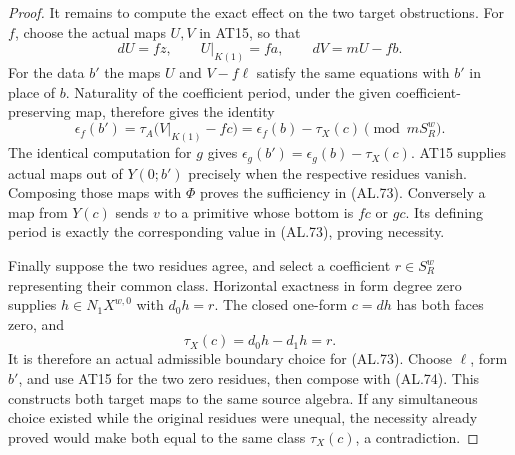 \begin{proof}
It remains to compute the exact effect on the two target
obstructions. For $f$, choose the actual maps $U,V$ in AT15,
so that
\[
 dU=fz,\qquad U|_{K(1)}=fa,\qquad dV=mU-fb.
\]
For the data $b'$ the maps $U$ and $V-f\ell$ satisfy the
same equations with $b'$ in place of $b$. Naturality of the
coefficient period, under the given coefficient-preserving map,
therefore gives the identity
\[
 \epsilon_f(b')
    =\tau_A\bigl(V|_{K(1)}-fc\bigr)
    =\epsilon_f(b)-\tau_X(c)\pmod {mS_R^w}.
 \tag{AL.75}
\]
The identical computation for $g$ gives
$\epsilon_g(b')=\epsilon_g(b)-\tau_X(c)$.
AT15 supplies actual maps out of $Y(0;b')$ precisely when
the respective residues vanish. Composing those maps with
$\Phi$ proves the sufficiency in \textup{(AL.73)}.
Conversely a map from $Y(c)$ sends $v$ to a primitive whose
bottom is $fc$ or $gc$. Its defining period is exactly the
corresponding value in \textup{(AL.73)}, proving necessity.

Finally suppose the two residues agree, and select a coefficient
$r\in S_R^w$ representing their common class.
Horizontal exactness in form degree zero supplies
$h\in N_1X^{w,0}$ with $d_0h=r$.
The closed one-form $c=dh$ has both faces zero, and
\[
                    \tau_X(c)=d_0h-d_1h=r.
 \tag{AL.76}
\]
It is therefore an actual admissible boundary choice for
\textup{(AL.73)}. Choose $\ell$, form $b'$, and use AT15
for the two zero residues, then compose with \textup{(AL.74)}.
This constructs both target maps to the same source algebra.
If any simultaneous choice existed while the original residues
were unequal, the necessity already proved would make both
equal to the same class $\tau_X(c)$, a contradiction.
\end{proof}
